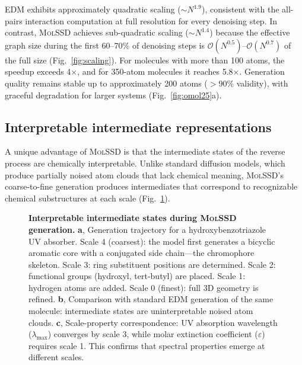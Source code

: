 \documentclass[11pt]{article}
\newcommand{\molssd}{\textsc{MolSSD}}
\begin{document}
EDM exhibits approximately quadratic scaling ($\sim N^{1.9}$), consistent with the all-pairs interaction computation at full resolution for every denoising step. In contrast, \molssd{} achieves sub-quadratic scaling ($\sim N^{1.4}$) because the effective graph size during the first 60--70\% of denoising steps is $\mathcal{O}(N^{0.5})$--$\mathcal{O}(N^{0.7})$ of the full size (Fig.~\ref{fig:scaling}). For molecules with more than 100 atoms, the speedup exceeds 4$\times$, and for 350-atom molecules it reaches 5.8$\times$. Generation quality remains stable up to approximately 200 atoms ($>$90\% validity), with graceful degradation for larger systems (Fig.~\ref{fig:omol25}a).


\subsection*{Interpretable intermediate representations}

A unique advantage of \molssd{} is that the intermediate states of the reverse process are chemically interpretable. Unlike standard diffusion models, which produce partially noised atom clouds that lack chemical meaning, \molssd{}'s coarse-to-fine generation produces intermediates that correspond to recognizable chemical substructures at each scale (Fig.~\ref{fig:intermediates}).

\begin{figure}[t]
    \centering
    \caption{\textbf{Interpretable intermediate states during \molssd{} generation.} \textbf{a}, Generation trajectory for a hydroxybenzotriazole UV absorber. Scale 4 (coarsest): the model first generates a bicyclic aromatic core with a conjugated side chain---the chromophore skeleton. Scale 3: ring substituent positions are determined. Scale 2: functional groups (hydroxyl, tert-butyl) are placed. Scale 1: hydrogen atoms are added. Scale 0 (finest): full 3D geometry is refined. \textbf{b}, Comparison with standard EDM generation of the same molecule: intermediate states are uninterpretable noised atom clouds. \textbf{c}, Scale-property correspondence: UV absorption wavelength ($\lambda_{\max}$) converges by scale 3, while molar extinction coefficient ($\varepsilon$) requires scale 1. This confirms that spectral properties emerge at different scales.}
    \label{fig:intermediates}
\end{figure}
\end{document}
